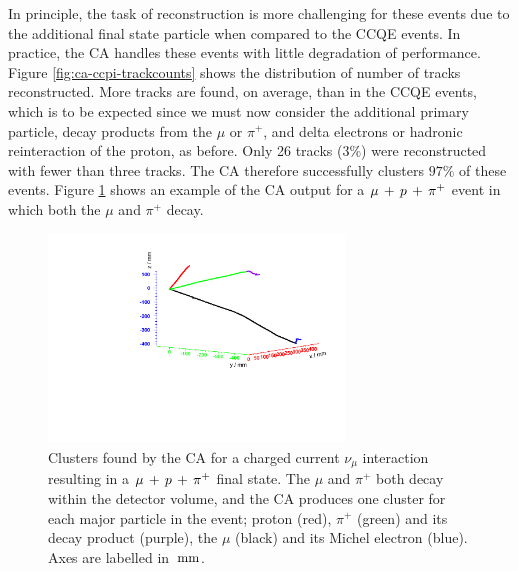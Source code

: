 In principle, the task of reconstruction is more challenging for these events due to the additional final state particle when compared to the CCQE events. In practice, the \ac{CA} handles these events with little degradation of performance. Figure \ref{fig:ca-ccpi-trackcounts} shows the distribution of number of tracks reconstructed. More tracks are found, on average, than in the CCQE events, which is to be expected since we must now consider the additional primary particle, decay products from the $\mu$ or $\pi^+$, and delta electrons or hadronic reinteraction of the proton, as before. Only 26 tracks ($3\%$) were reconstructed with fewer than three tracks. The \ac{CA} therefore successfully clusters $97\%$ of these events. Figure \ref{fig:ca-clusters-ccpi} shows an example of the CA output for a $\ccpi$ event in which both the $\mu$ and $\pi^+$ decay.

\begin{figure}
    \centering
    \includegraphics[angle=-90,width=0.7\textwidth]{chapters/cellularautomaton_images/ccpi_bothdecay}
    \caption[Clusters found by the CA in a $\ccpi$ event]{\label{fig:ca-clusters-ccpi}Clusters found by the CA for a charged current $\nu_\mu$ interaction resulting in a $\ccpi$ final state. The $\mu$ and $\pi^+$ both decay within the detector volume, and the CA produces one cluster for each major particle in the event; proton (red), $\pi^+$ (green) and its decay product (purple), the $\mu$ (black) and its Michel electron (blue). Axes are labelled in $\,\mathrm{mm}$.}
\end{figure}

